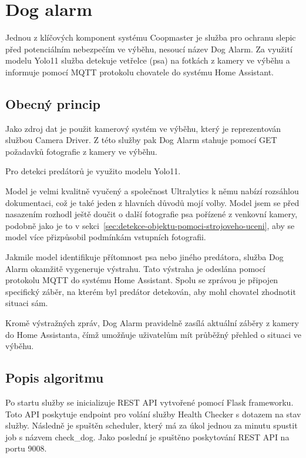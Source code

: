 \section{Dog alarm}\label{sec:dog-alarm}
Jednou z klíčových komponent systému Coopmaster je služba pro ochranu slepic před potenciálním nebezpečím ve výběhu, nesoucí název Dog Alarm.
Za využití modelu Yolo11 služba detekuje vetřelce (psa) na fotkách z kamery ve výběhu a informuje pomocí MQTT protokolu chovatele do systému Home Assistant.

\subsection*{Obecný princip}
Jako zdroj dat je použit kamerový systém ve výběhu, který je reprezentován službou Camera Driver.
Z této služby pak Dog Alarm stahuje pomocí GET požadavků fotografie z kamery ve výběhu.\newline

Pro detekci predátorů je využito modelu Yolo11.

Model je velmi kvalitně vyučený a společnost Ultralytics k němu nabízí rozsáhlou dokumentaci, což je také jeden z hlavních důvodů mojí volby.
Model jsem se před nasazením rozhodl ještě doučit o další fotografie psa pořízené z venkovní kamery, podobně jako je to v sekci~\ref{sec:detekce-objektu-pomoci-strojoveho-uceni}, aby se model více přizpůsobil podmínkám vstupních fotografii.\newline

Jakmile model identifikuje přítomnost psa nebo jiného predátora, služba Dog Alarm okamžitě vygeneruje výstrahu.
Tato výstraha je odeslána pomocí protokolu MQTT do systému Home Assistant.
Spolu se zprávou je připojen specifický záběr, na kterém byl predátor detekován, aby mohl chovatel zhodnotit situaci sám.\newline

Kromě výstražných zpráv, Dog Alarm pravidelně zasílá aktuální záběry z kamery do Home Assistanta, čímž umožňuje uživatelům mít průběžný přehled o situaci ve výběhu.\newline

\subsection*{Popis algoritmu}
Po startu služby se inicializuje REST API vytvořené pomocí Flask frameworku.
Toto API poskytuje endpoint pro volání služby Health Checker s dotazem na stav služby.
Následně je spuštěn scheduler, který má za úkol jednou za minutu spustit job s názvem check\_dog.
Jako poslední je spuštěno poskytování REST API na portu 9008.\newline

